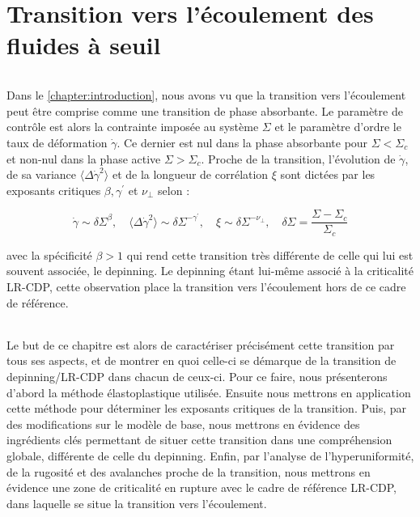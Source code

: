 \chapter{Transition vers l'écoulement des fluides à seuil}

\label{chapter:yielding}

\subparagraph{}Dans le \autoref{chapter:introduction}, nous avons vu que la transition vers l'écoulement peut être comprise comme une transition de phase absorbante. Le paramètre de contrôle est alors la contrainte imposée au système $\Sigma$ et le paramètre d'ordre le taux de déformation $\dot{\gamma}$. Ce dernier est nul dans la phase absorbante pour $\Sigma < \Sigma_c$ et non-nul dans la phase active $\Sigma > \Sigma_c$. Proche de la transition, l'évolution de $\dot{\gamma}$, de sa variance $\langle\Delta\dot{\gamma}^2\rangle$ et de la longueur de corrélation $\xi$ sont dictées par les exposants critiques $\beta, \gamma^\prime$ et $\nu_\perp$ selon :

\begin{equation}
	\dot{\gamma} \sim \delta\Sigma^\beta,\quad \langle\Delta\dot{\gamma}^2\rangle \sim \delta\Sigma^{-\gamma^\prime}, \quad \xi \sim \delta\Sigma^{-\nu_\perp}, \quad \delta\Sigma = \frac{\Sigma-\Sigma_c}{\Sigma_c}
\end{equation}

\noindent avec la spécificité $\beta>1$ qui rend cette transition très différente de celle qui lui est souvent associée, le depinning. Le depinning étant lui-même associé à la criticalité LR-CDP, cette observation place la transition vers l'écoulement hors de ce cadre de référence. 

\subparagraph{}Le but de ce chapitre est alors de caractériser précisément cette transition par tous ses aspects, et de montrer en quoi celle-ci se démarque de la transition de depinning/LR-CDP dans chacun de ceux-ci. Pour ce faire, nous présenterons d'abord la méthode élastoplastique utilisée. Ensuite nous mettrons en application cette méthode pour déterminer les exposants critiques de la transition. Puis, par des modifications sur le modèle de base, nous mettrons en évidence des ingrédients clés permettant de situer cette transition dans une compréhension globale, différente de celle du depinning. Enfin, par l'analyse de l'hyperuniformité, de la rugosité et des avalanches proche de la transition, nous mettrons en évidence une zone de criticalité en rupture avec le cadre de référence LR-CDP, dans laquelle se situe la transition vers l'écoulement.


